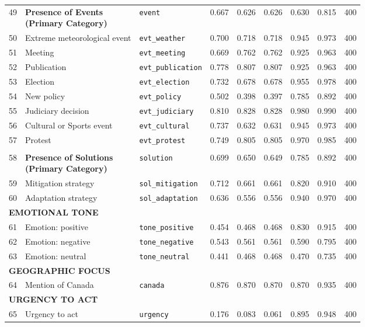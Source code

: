 \begin{longtable}{p{0.5cm}p{4.4cm}p{3.0cm}rrrrrr}
\midrule
\rowcolor{gray!8}
\multicolumn{9}{l}{\textit{Events}} \\
\midrule
49 & \textbf{Presence of Events\newline (Primary Category)} & \texttt{event} & 0.667 & 0.626 & 0.626 & 0.630 & 0.815 & 400 \\
\cmidrule(lr){1-9}
50 & Extreme meteorological event & \texttt{evt\_weather} & 0.700 & 0.718 & 0.718 & 0.945 & 0.973 & 400 \\
51 & Meeting & \texttt{evt\_meeting} & 0.669 & 0.762 & 0.762 & 0.925 & 0.963 & 400 \\
52 & Publication & \texttt{evt\_publication} & 0.778 & 0.807 & 0.807 & 0.925 & 0.963 & 400 \\
53 & Election & \texttt{evt\_election} & 0.732 & 0.678 & 0.678 & 0.955 & 0.978 & 400 \\
54 & New policy & \texttt{evt\_policy} & 0.502 & 0.398 & 0.397 & 0.785 & 0.892 & 400 \\
55 & Judiciary decision & \texttt{evt\_judiciary} & 0.810 & 0.828 & 0.828 & 0.980 & 0.990 & 400 \\
56 & Cultural or Sports event & \texttt{evt\_cultural} & 0.737 & 0.632 & 0.631 & 0.945 & 0.973 & 400 \\
57 & Protest & \texttt{evt\_protest} & 0.749 & 0.805 & 0.805 & 0.970 & 0.985 & 400 \\
\midrule
\rowcolor{gray!8}
\multicolumn{9}{l}{\textit{Solutions}} \\
\midrule
58 & \textbf{Presence of Solutions\newline (Primary Category)} & \texttt{solution} & 0.699 & 0.650 & 0.649 & 0.785 & 0.892 & 400 \\
\cmidrule(lr){1-9}
59 & Mitigation strategy & \texttt{sol\_mitigation} & 0.712 & 0.661 & 0.661 & 0.820 & 0.910 & 400 \\
60 & Adaptation strategy & \texttt{sol\_adaptation} & 0.636 & 0.556 & 0.556 & 0.940 & 0.970 & 400 \\
\midrule
\multicolumn{9}{l}{\cellcolor{gray!10}\textbf{EMOTIONAL TONE}} \\
\midrule
61 & Emotion: positive & \texttt{tone\_positive} & 0.454 & 0.468 & 0.468 & 0.830 & 0.915 & 400 \\
62 & Emotion: negative & \texttt{tone\_negative} & 0.543 & 0.561 & 0.561 & 0.590 & 0.795 & 400 \\
63 & Emotion: neutral & \texttt{tone\_neutral} & 0.441 & 0.468 & 0.468 & 0.470 & 0.735 & 400 \\
\midrule
\multicolumn{9}{l}{\cellcolor{gray!10}\textbf{GEOGRAPHIC FOCUS}} \\
\midrule
64 & Mention of Canada & \texttt{canada} & 0.876 & 0.870 & 0.870 & 0.870 & 0.935 & 400 \\
\midrule
\multicolumn{9}{l}{\cellcolor{gray!10}\textbf{URGENCY TO ACT}} \\
\midrule
65 & Urgency to act & \texttt{urgency} & 0.176 & 0.083 & 0.061 & 0.895 & 0.948 & 400 \\
\end{longtable}